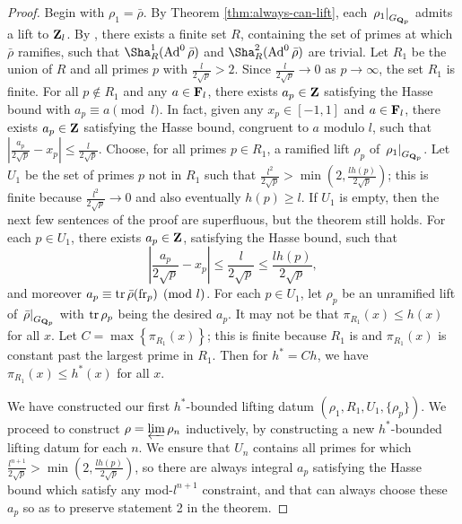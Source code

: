 \begin{proof}
Begin with $\rho_1= \bar\rho$. By Theorem \ref{thm:always-can-lift}, each 
$\left.\rho_1\right|_{G_{\mathbf{Q}_p}}$ admits a lift to $\mathbf{Z}_l$. 
By \cite[Lem.~6]{khare-larsen-ramakrishna-2005}, 
there exists a finite set $R$, containing the set of primes at which $\bar\rho$ 
ramifies, such that $\Sha_R^1(\Ad^0\bar\rho)$ and $\Sha_R^2(\Ad^0\bar\rho)$ are 
trivial. 
Let $R_1$ be the union of $R$ and all primes $p$ with 
$\frac{l}{2\sqrt p} > 2$. Since $\frac{l}{2\sqrt p} \to 0$ as $p\to \infty$, 
the set $R_1$ is finite. For all $p\notin R_1$ and any $a\in \mathbf{F}_l$, there 
exists $a_p\in \mathbf{Z}$ satisfying the Hasse bound with $a_p\equiv a\pmod l$. In 
fact, given any $x_p\in [-1,1]$ and $a\in \mathbf{F}_l$, there exists $a_p\in \mathbf{Z}$ 
satisfying the Hasse bound, congruent to $a$ modulo $l$, such that 
$\left| \frac{a_p}{2\sqrt p} - x_p\right| \leqslant \frac{l}{2\sqrt p}$.
Choose, for all primes $p\in R_1$, a ramified 
lift $\rho_p$ of $\left. \rho_1\right|_{G_{\mathbf{Q}_p}}$. Let $U_1$ be the set of 
primes $p$ not in $R_1$ such that 
$\frac{l^2}{2\sqrt p} > \min\left(2, \frac{l h(p)}{2\sqrt p}\right)$; this is 
finite because $\frac{l^2}{2\sqrt p} \to 0$ and also eventually 
$h(p) \geqslant l$. If $U_1$ is empty, then the next few sentences of the 
proof are superfluous, but the theorem still holds. 
For each $p\in U_1$, there exists $a_p\in \mathbf{Z}$, satisfying the 
Hasse bound, such that 
\[
	\left| \frac{a_p}{2\sqrt p} - x_p\right| \leqslant \frac{l}{2\sqrt p} \leqslant \frac{l h(p)}{2\sqrt p} ,
\]
and moreover $a_p\equiv \operatorname{tr}\bar\rho(\mathrm{fr}_p)\pmod l$. For each $p\in U_1$, let 
$\rho_p$ be an unramified lift of $\left.\bar\rho\right|_{G_{\mathbf{Q}_p}}$ with 
$\operatorname{tr}\rho_p$ being the desired $a_p$. It may not be that 
$\pi_{R_1}(x) \leqslant h(x)$ for all $x$. Let 
$C = \max\left\{\pi_{R_1}(x)\right\}$; this is finite because 
$R_1$ is and $\pi_{R_1}(x)$ is constant past the largest prime in $R_1$. Then 
for $h^\ast = C h$, we have $\pi_{R_1}(x) \leqslant h^\ast(x)$ for all $x$. 

We have constructed our first $h^\ast$-bounded lifting datum 
$(\rho_1,R_1,U_1,\{\rho_p\})$. We proceed to construct 
$\rho = \varprojlim \rho_n$ inductively, by constructing a new $h^\ast$-bounded 
lifting datum for each $n$. We ensure that $U_n$ contains all primes for which 
$\frac{l^{n+1}}{2\sqrt p} > \min\left(2, \frac{l h(p)}{2\sqrt p}\right)$, so 
there are always integral $a_p$ satisfying the Hasse bound which satisfy any 
mod-$l^{n+1}$ constraint, and that can always choose these $a_p$ so as to 
preserve statement 2 in the theorem. 


\end{proof}
